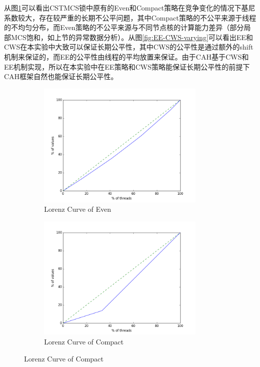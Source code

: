 从图\ref{fig:compact-even-varying}可以看出CSTMCS锁中原有的Even和Compact策略在竞争变化的情况下基尼系数较大，存在较严重的长期不公平问题，其中Compact策略的不公平来源于线程的不均匀分布，而Even策略的不公平来源与不同节点核的计算能力差异（部分局部MCS饱和，如上节的异常数据分析）。从图\ref{fig:EE-CWS-varying}可以看出EE和CWS在本实验中大致可以保证长期公平性，其中CWS的公平性是通过额外的shift机制来保证的，而EE的公平性由线程的平均放置来保证。由于CAH基于CWS和EE机制实现，所以在本实验中在EE策略和CWS策略能保证长期公平性的前提下CAH框架自然也能保证长期公平性。

\begin{figure}[!htp]
  \centering
  \begin{subfigure}{8.0cm}
    \centering
    \includegraphics[height=6.0cm]{figure/even-varying.png}
    \caption{Lorenz Curve of Even}
  \end{subfigure}
  \hspace{2em}
  \begin{subfigure}{6.0cm}
    \centering
    \includegraphics[height=6.0cm]{figure/compact-varying.png}
    \caption{Lorenz Curve of Compact}
  \end{subfigure}
  \label{fig:compact-even-varying}
\end{figure}


